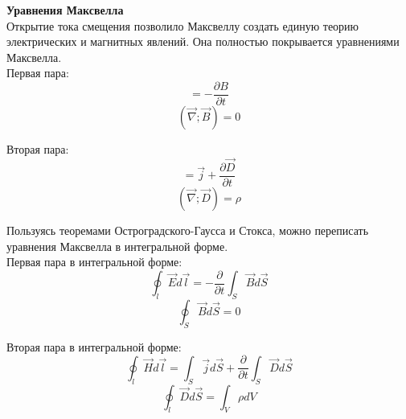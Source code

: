 \documentclass{article}
\begin{document}
	
	\textbf{Уравнения Максвелла}\\

	Открытие тока смещения позволило Максвеллу создать единую теорию электрических и магнитных явлений. Она полностью покрывается уравнениями Максвелла.\\

	Первая пара:
	\begin{equation}
		[\vec\nabla;\vec E] = -\frac{\partial B}{\partial t}
	\end{equation}
	\begin{equation}
		(\vec\nabla;\vec B) = 0
	\end{equation}

	Вторая пара:
	\begin{equation}
		[\vec\nabla;\vec H] = \vec j + \frac{\partial\vec D}{\partial t}
	\end{equation}
	\begin{equation}
		(\vec\nabla;\vec D) = \rho
	\end{equation}

	Пользуясь теоремами Остроградского-Гаусса и Стокса, можно переписать уравнения Максвелла в интегральной форме.\\

	Первая пара в интегральной форме:
	\begin{equation}
		\oint_l \vec E d\vec l = -\frac{\partial}{\partial t}\int_S \vec B d\vec S
	\end{equation}
	\begin{equation}
		\oint_S \vec B d\vec S = 0
	\end{equation}

	Вторая пара в интегральной форме:
	\begin{equation}
		\oint_l \vec H d\vec l = \int_S \vec j d\vec S + \frac{\partial}{\partial t} \int_S \vec D d\vec S
	\end{equation}
	\begin{equation}
		\oint_l \vec D d\vec S = \int_V \rho dV
	\end{equation}
\end{document}
